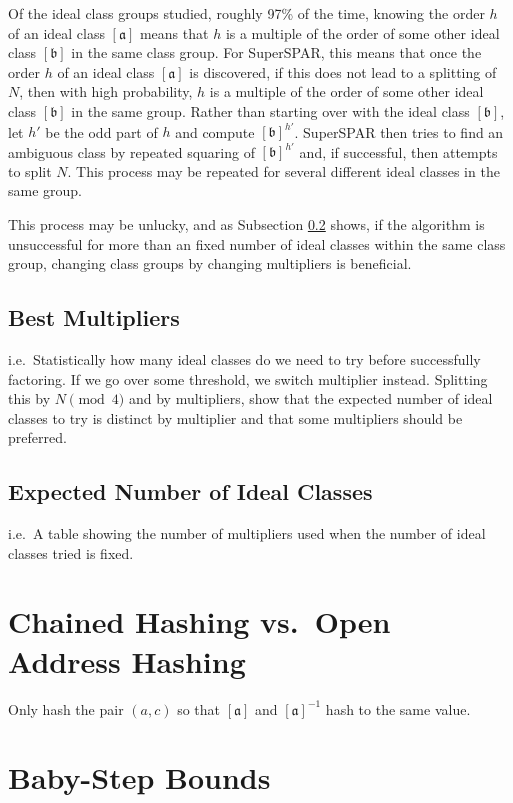 \documentclass{ucalgthes1}
\theoremstyle{definition}
\newcommand{\ideal}{\mathfrak}
\newcommand{\idealclass}[1]{\left[ \ideal #1 \right]}
\newcommand{\aclass}{\idealclass a}
\newcommand{\bclass}{\idealclass b}
\begin{document}
Of the ideal class groups studied, roughly 97\% of the time, knowing the order $h$ of an ideal class $\aclass$ means that $h$ is a multiple of the order of some other ideal class $\bclass$ in the same class group.  For SuperSPAR, this means that once the order $h$ of an ideal class $\aclass$ is discovered, if this does not lead to a splitting of $N$, then with high probability, $h$ is a multiple of the order of some other ideal class $\bclass$ in the same group.  Rather than starting over with the ideal class $\bclass$, let $h'$ be the odd part of $h$ and compute $\bclass^{h'}$.  SuperSPAR then tries to find an ambiguous class by repeated squaring of $\bclass^{h'}$ and, if successful, then attempts to split $N$.  This process may be repeated for several different ideal classes in the same group.

This process may be unlucky, and as Subsection \ref{subsec:ssparExpIdeals} shows, if the algorithm is unsuccessful for more than an fixed number of ideal classes within the same class group, changing class groups by changing multipliers is beneficial.


\subsection{Best Multipliers}
\label{subsec:ssparBestMultipliers}
i.e.\ Statistically how many ideal classes do we need to try before successfully factoring.  If we go over some threshold, we switch multiplier instead.  Splitting this by $N \pmod 4$ and by multipliers, show that the expected number of ideal classes to try is distinct by multiplier and that some multipliers should be preferred.

\subsection{Expected Number of Ideal Classes}
\label{subsec:ssparExpIdeals}
i.e.\ A table showing the number of multipliers used when the number of ideal classes tried is fixed.



\section{Chained Hashing vs.\ Open Address Hashing}

Only hash the pair $(a,c)$ so that $\aclass$ and $\aclass^{-1}$ hash to the same value.


\section{Baby-Step Bounds}
\label{sec:ssparBabyStepBounds}
\end{document}
